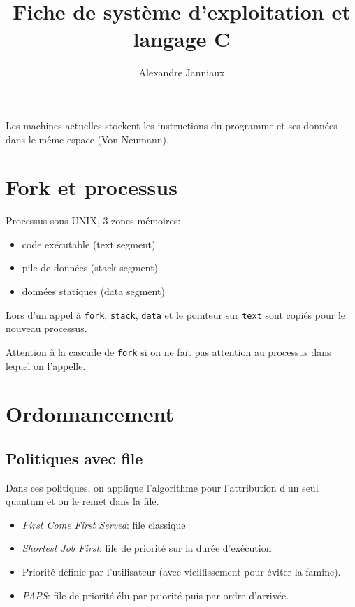 \documentclass[a4paper]{article}
\title{Fiche de système d'exploitation et langage C}
\author{Alexandre Janniaux}
\begin{document}
\maketitle
\pagebreak

\begin{multicols*}{2}

    Les machines actuelles stockent les instructions du programme et ses données dans le même espace (Von Neumann).

    \section{Fork et processus}

    Processus sous {UNIX}, 3 zones mémoires:
    \begin{itemize}
        \item code exécutable (text segment)
        \item pile de données (stack segment)
        \item données statiques (data segment)
    \end{itemize}

    Lors d'un appel à \texttt{fork}, \texttt{stack}, \texttt{data} et le pointeur sur \texttt{text} sont copiés pour le nouveau processus.

    Attention à la cascade de \texttt{fork} si on ne fait pas attention au processus dans lequel on l'appelle.

    \section{Ordonnancement}

    \subsection{Politiques avec file}
    Dans ces politiques, on applique l'algorithme pour l'attribution d'un seul quantum et on le remet dans la file.
    \begin{itemize}
        \item \emph{First Come First Served}: file classique
        \item \emph{Shortest Job First}: file de priorité sur la durée d'exécution 
        \item \emph{} Priorité définie par l'utilisateur (avec vieillissement pour éviter la famine).
        \item \emph{PAPS}: file de priorité élu par priorité puis par ordre d'arrivée.
    \end{itemize}


\end{multicols*}
\end{document}
